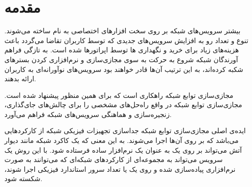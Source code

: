 \chapter{مقدمه}


بیشتر سرویس‌های شبکه بر روی سخت افزارهای اختصاصی به نام
ساخته می‌شوند.
تنوع و تعداد رو به افزایش سرویس‌های جدیدی که توسط کاربران تقاضا می‌گردد
باعث هزینه‌های زیاد برای خرید و نگهداری
‌ها
توسط اپراتورها شده است.
به تازگی فراهم آورندگان شبکه
شروع به حرکت به سوی مجازی‌سازی و نرم‌افزاری کردن بسترهای شکبه کرده‌اند،
به این ترتیب آن‌ها قادر خواهند بود
سرویس‌های نوآورانه‌ای به کاربران ارائه بدهند.

مجازی‌سازی توابع شبکه‌ راهکاری است که برای همین منظور پیشنهاد شده است.
مجازی‌سازی توابع شبکه‌ در واقع راه‌حل‌های مشخصی را برای چالش‌های جای‌گذاری،
زنجیره‌سازی و هماهنگی سرویس‌های شبکه فراهم می‌آورد.

ایده‌ی اصلی مجازی‌سازی توابع شبکه جداسازی تجهیزات فیزیکی شبکه از کارکردهایی می‌باشد که
بر روی آن‌ها اجرا می‌شوند.
به این معنی که یک کاکرد شبکه مانند دیوار آتش می‌تواند بر روی یک
به عنوان یک نرم‌افزار ساده فرستاده شود.
با این روش یک سرویس می‌تواند به مجموعه‌ای از کارکردهای شبکه‌ای که می‌توانند به صورت نرم‌افزاری پیاده‌سازی شده
و روی یک یا تعداد سرور استاندارد فیزیکی اجرا شوند، شکسته شود.
\cite{Mijumbi2016}